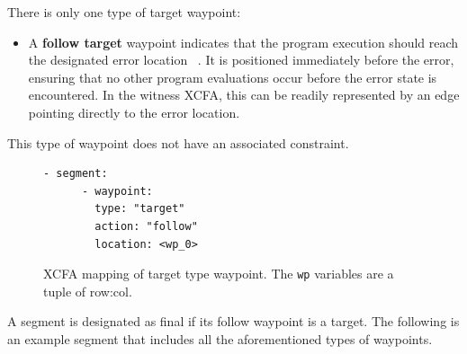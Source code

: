 There is only one type of target waypoint:
\begin{itemize}
  \item A \textbf{follow target} waypoint indicates that the program execution should reach 
    the designated error location ~\cite{witness2}. It is positioned immediately before the error, 
    ensuring that no other program evaluations occur before the error state is encountered. 
    In the witness XCFA, this can be readily represented by an edge pointing directly to the error location.
\end{itemize}
This type of waypoint does not have an associated constraint.

\begin{figure}[H]
  \centering
  \begin{minipage}[t]{0.35\textwidth}
    \begin{lstlisting}[style=c, columns=flexibl]
    - segment:
      - waypoint:
        type: "target"
        action: "follow"
        location: <wp_0>
    \end{lstlisting}
    \end{minipage}
    \hspace{2cm}
  \caption{XCFA mapping of target type waypoint. The \texttt{wp} variables are a tuple of row:col.}
  \label{fig:combined}
\end{figure}


A segment is designated as final if its follow waypoint is a target.
The following is an example segment that includes all the aforementioned types of waypoints.

